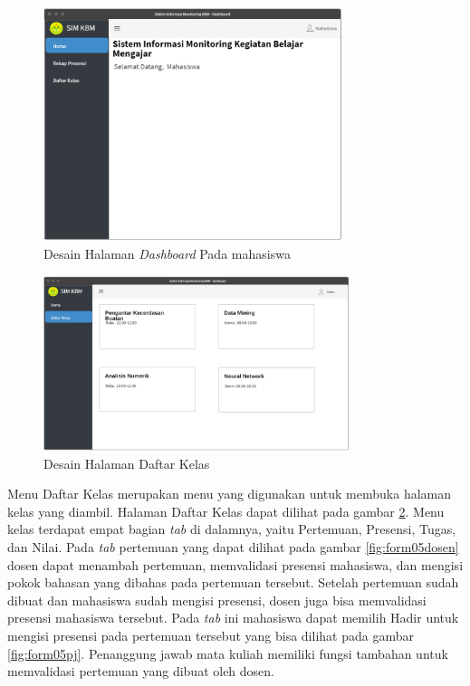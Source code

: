 \begin{figure}[h!]
	\centering
	\includegraphics[width=0.8\textwidth]{gambar/mockup/home_mahasiswa}
	\caption{Desain Halaman \textit{Dashboard} Pada mahasiswa}
	\label{fig:dashboard}
\end{figure}

\begin{figure}[h!]
	\centering
	\includegraphics[width=0.8\textwidth]{gambar/mockup/daftar_kelas}
	\caption{Desain Halaman Daftar Kelas}
	\label{fig:daftarkelas}
\end{figure}

Menu Daftar Kelas merupakan menu yang digunakan untuk membuka halaman kelas yang diambil. Halaman Daftar Kelas dapat dilihat pada gambar \ref{fig:daftarkelas}. Menu kelas terdapat empat bagian \textit{tab} di dalamnya, yaitu Pertemuan, Presensi, Tugas, dan Nilai. Pada \textit{tab} pertemuan yang dapat dilihat pada gambar \ref{fig:form05dosen} dosen dapat menambah pertemuan, memvalidasi presensi mahasiswa, dan mengisi pokok bahasan yang dibahas pada pertemuan tersebut. Setelah pertemuan sudah dibuat dan mahasiswa sudah mengisi presensi, dosen juga bisa memvalidasi presensi mahasiswa tersebut. Pada \textit{tab} ini mahasiswa dapat memilih Hadir untuk mengisi presensi pada pertemuan tersebut yang bisa dilihat pada gambar \ref{fig:form05pj}. Penanggung jawab mata kuliah memiliki fungsi tambahan untuk memvalidasi pertemuan yang dibuat oleh dosen.

